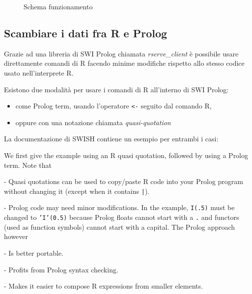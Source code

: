 \documentclass[10pt,titlepage,twoside,a4paper]{report}
\begin{document}
\begin{figure}[H]
\centering
\caption{Schema funzionamento}
\end{figure}

\subsection{Scambiare i dati fra R e Prolog}
Grazie ad una libreria di SWI Prolog chiamata 
\emph{rserve\_client}\cite{rserveclient} 
è possibile usare direttamente comandi di R facendo minime modifiche 
rispetto allo stesso codice usato nell'interprete R.

Esistono due modalità per usare i comandi di R all'interno di SWI Prolog:
\begin{itemize}
    \item come Prolog term, usando l'operatore \texttt{<-} seguito dal comando R,
    \item oppure con una notazione chiamata \emph{quasi-quotation}
\end{itemize}
La documentazione di SWISH contiene un esempio per entrambi i 
casi\cite{rprolognotations}:
\begin{displayquote}
[..] We first give the example using an R quasi quotation, followed by 
using a Prolog term.  Note that

  - Quasi quotations can be used to copy/paste R code into your Prolog
    program without changing it (except when it contains \texttt{|{\textbraceright}}).

  - Prolog code may need minor modifications.  In the example, \texttt{I(.5)}
    must be changed to \texttt{'I'(0.5)} because Prolog floats cannot start with
    a \texttt{.} and functors (used as function symbols) cannot start with a
    capital.  The Prolog approach however

    - Is better portable.

    - Profits from Prolog syntax checking.

    - Makes it easier to compose R expressions from smaller elements.
\end{displayquote}
\end{document}
